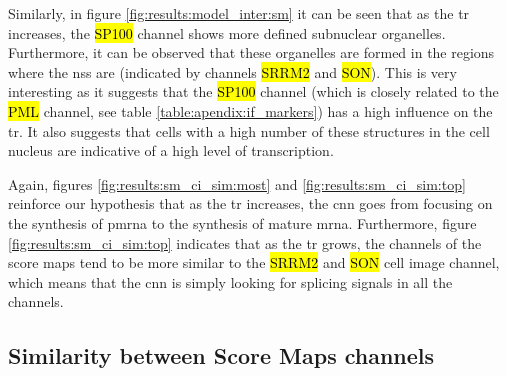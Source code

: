 Similarly, in figure \ref{fig:results:model_inter:sm} it can be seen that as the \gls{tr} increases, the \hl{SP100} channel shows more defined subnuclear organelles. Furthermore, it can be observed that these organelles are formed in the regions where the \glspl{ns} are (indicated by channels \hl{SRRM2} and \hl{SON}). This is very interesting as it suggests that the \hl{SP100} channel (which is closely related to the \hl{PML} channel, see table \ref{table:apendix:if_markers}) has a high influence on the \gls{tr}. It also suggests that cells with a high number of these structures in the cell nucleus are indicative of a high level of transcription.

Again, figures \ref{fig:results:sm_ci_sim:most} and \ref{fig:results:sm_ci_sim:top} reinforce our hypothesis that as the \gls{tr} increases, the \gls{cnn} goes from focusing on the synthesis of \gls{pmrna} to the synthesis of mature \gls{mrna}.
Furthermore, figure \ref{fig:results:sm_ci_sim:top} indicates that as the \gls{tr} grows, the channels of the score maps tend to be more similar to the \hl{SRRM2} and \hl{SON} cell image channel, which means that the \gls{cnn} is simply looking for splicing signals in all the channels.

\subsection{Similarity between Score Maps channels}
